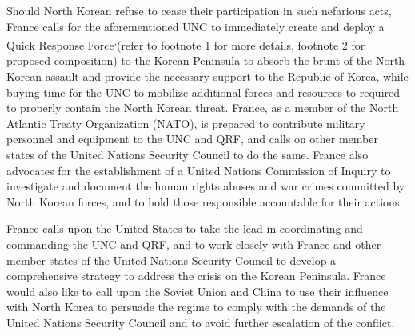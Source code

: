 \documentclass[a4paper,12pt]{article}
\begin{document}
Should North Korean refuse to cease their participation in such nefarious acts, France calls for the aforementioned UNC to immediately create and deploy a Quick Response Force\footnotemark[1]\textsuperscript{,}\footnotemark[2] (refer to footnote 1 for more details, footnote 2 for proposed composition) to the Korean Peninsula to absorb the brunt of the North Korean assault and provide the necessary support to the Republic of Korea, while buying time for the UNC to mobilize additional forces and resources to required to properly contain the North Korean threat. France, as a member of the North Atlantic Treaty Organization (NATO), is prepared to contribute military personnel and equipment to the UNC and QRF, and calls on other member states of the United Nations Security Council to do the same. France also advocates for the establishment of a United Nations Commission of Inquiry to investigate and document the human rights abuses and war crimes committed by North Korean forces, and to hold those responsible accountable for their actions.

France calls upon the United States to take the lead in coordinating and commanding the UNC and QRF, and to work closely with France and other member states of the United Nations Security Council to develop a comprehensive strategy to address the crisis on the Korean Peninsula. France would also like to call upon the Soviet Union and China to use their influence with North Korea to persuade the regime to comply with the demands of the United Nations Security Council and to avoid further escalation of the conflict.

\newpage
\end{document}
